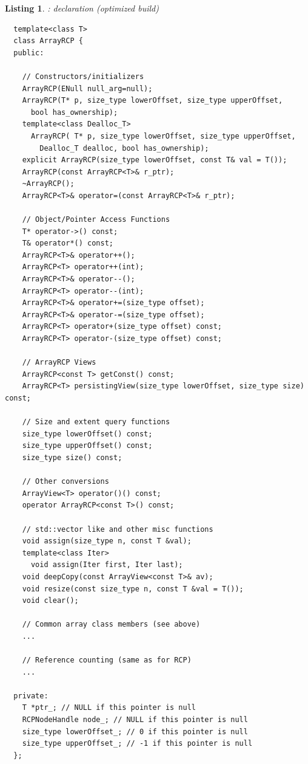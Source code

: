 \documentclass[pdf,ps2pdf,11pt]{SANDreport}
\newtheorem{listing}{Listing}
\begin{document}
\begin{listing}: {} declaration (optimized build)\\
\label{listing:ArrayRCP}
{\small\begin{verbatim}
  template<class T>
  class ArrayRCP {
  public:
  
    // Constructors/initializers
    ArrayRCP(ENull null_arg=null);
    ArrayRCP(T* p, size_type lowerOffset, size_type upperOffset,
      bool has_ownership);
    template<class Dealloc_T>
      ArrayRCP( T* p, size_type lowerOffset, size_type upperOffset,
        Dealloc_T dealloc, bool has_ownership);
    explicit ArrayRCP(size_type lowerOffset, const T& val = T());
    ArrayRCP(const ArrayRCP<T>& r_ptr);
    ~ArrayRCP();
    ArrayRCP<T>& operator=(const ArrayRCP<T>& r_ptr);

    // Object/Pointer Access Functions 
    T* operator->() const;
    T& operator*() const;
    ArrayRCP<T>& operator++();
    ArrayRCP<T> operator++(int);
    ArrayRCP<T>& operator--();
    ArrayRCP<T> operator--(int);
    ArrayRCP<T>& operator+=(size_type offset);
    ArrayRCP<T>& operator-=(size_type offset);
    ArrayRCP<T> operator+(size_type offset) const;
    ArrayRCP<T> operator-(size_type offset) const;
  
    // ArrayRCP Views
    ArrayRCP<const T> getConst() const;
    ArrayRCP<T> persistingView(size_type lowerOffset, size_type size) const;
  
    // Size and extent query functions 
    size_type lowerOffset() const;
    size_type upperOffset() const;
    size_type size() const;
  
    // Other conversions
    ArrayView<T> operator()() const;
    operator ArrayRCP<const T>() const;
  
    // std::vector like and other misc functions
    void assign(size_type n, const T &val);
    template<class Iter>
      void assign(Iter first, Iter last);
    void deepCopy(const ArrayView<const T>& av);
    void resize(const size_type n, const T &val = T());
    void clear();

    // Common array class members (see above)
    ...
  
    // Reference counting (same as for RCP)
    ...
  
  private:
    T *ptr_; // NULL if this pointer is null
    RCPNodeHandle node_; // NULL if this pointer is null
    size_type lowerOffset_; // 0 if this pointer is null
    size_type upperOffset_; // -1 if this pointer is null
  };
  

\end{verbatim}}
\end{listing}
\end{document}
